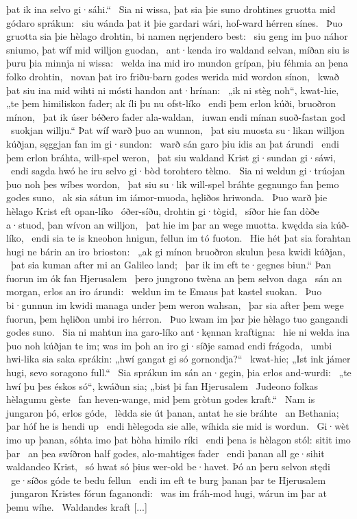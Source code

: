 þat ik ina selvo gi·sáhi.“ \hld\ Sia ni wissa, þat sia þie suno drohtines
gruotta mid gódaro sprákun: \hld\ siu wánda þat it þie gardari wári,
hof-ward hérren sínes. \hld\ Þuo gruotta sia þie hèlago drohtin,
bi namen nęrjendero best: \hld\ siu geng im þuo náhor sniumo,
þat wíf mid willjon guodan, \hld\ ant·kenda iro waldand selvan,
míðan siu is þuru þia minnja ni wissa: \hld\ welda ina mid iro mundon grípan,
þiu féhmia an þena folko drohtin, \hld\ novan þat iro friðu-barn godes
werida mid wordon sínon, \hld\ kwað þat siu ina mid wihti ni mósti
handon ant·hrínan: \hld\ „ik ni stèg noh“, kwat-hie, „te þem himiliskon fader;
ak íli þu nu ofst-líko \hld\ endi þem erlon kúði,
bruoðron mínon, \hld\ þat ik úser béðero fader
ala-waldan, \hld\ iuwan endi mínan
suoð-fastan god \hld\ suokjan willju.“
Þat wíf warð þuo an wunnon, \hld\ þat siu muosta su·likan willjon kúðjan,
sęggjan fan im gi·sundon: \hld\ warð sán garo
þiu idis an þat árundi \hld\ endi þem erlon bráhta,
will-spel weron, \hld\ þat siu waldand Krist
gi·sundan gi·sáwi, \hld\ endi sagda hwó he iru selvo gi·bòd
torohtero tèkno. \hld\ Sia ni weldun gi·trúojan þuo noh
þes wíbes wordon, \hld\ þat siu su·lik will-spel bráhte
gegnungo fan þemo godes suno, \hld\ ak sia sátun im iámor-muoda,
hęliðos hriwonda. \hld\ Þuo warð þie hèlago Krist
eft opan-líko \hld\ óðer-síðu,
drohtin gi·tògid, \hld\ síðor hie fan dòðe a·stuod,
þan wívon an willjon, \hld\ þat hie im þar an wege muotta.
kwędda sia kúð-líko, \hld\ endi sia te is kneohon hnigun,
fellun im tó fuoton. \hld\ Hie hét þat sia forahtan hugi
ne bárin an iro brioston: \hld\ „ak gi mínon bruoðron skulun
þesa kwidi kúðjan, \hld\ þat sia kuman after mi
an Galileo land; \hld\ þar ik im eft te·gegnes biun.“
Þan fuorun im ók fan Hjerusalem \hld\ þero jungrono twèna
an þem selvon daga \hld\ sán an morgan,
erlos an iro árundi: \hld\ weldun im te Emaus
þat kastel suokan. \hld\ Þuo bi·gunnun im kwidi managa
under þem weron wahsan, \hld\ þar sia after þem wege fuorun,
þem hęliðon umbi iro hérron. \hld\ Þuo kwam im þar þie hèlago tuo
gangandi godes suno. \hld\ Sia ni mahtun ina garo-líko
ant·kęnnan kraftigna: \hld\ hie ni welda ina þuo noh kúðjan te im;
was im þoh an iro gi·síðje samad endi frágoda, \hld\ umbi hwi-lika sia saka sprákin:
„hwí gangat gi só gornondja?“ \hld\ kwat-hie; „Ist ink jámer hugi,
sevo soragono full.“ \hld\ Sia sprákun im sán an·gegin,
þia erlos and-wurdi: \hld\ „te hwí þu þes éskos só“, kwáðun sia;
„bist þi fan Hjerusalem \hld\ Judeono folkas
hèlagumu gèste \hld\ fan heven-wange,
mid þem gròtun godes kraft.“ \hld\ Nam is jungaron þó,
erlos góde, \hld\ lèdda sie út þanan,
antat he sie bráhte \hld\ an Bethania;
þar hóf he is hendi up \hld\ endi hèlegoda sie alle,
wíhida sie mid is wordun. \hld\ Gi·wèt imo up þanan,
sóhta imo þat hòha himilo ríki \hld\ endi þena is hèlagon stól:
sitit imo þar \hld\ an þea swíðron half godes,
alo-mahtiges fader \hld\ endi þanan all ge·sihit
waldandeo Krist, \hld\ só hwat só þius wer-old be·havet.
Þó an þeru selvon stędi \hld\ ge·síðos góde
te bedu fellun \hld\ endi im eft te burg þanan
þar te Hjerusalem \hld\ jungaron Kristes
fórun faganondi: \hld\ was im fráh-mod hugi,
wárun im þar at þemu wíhe. \hld\ Waldandes kraft
[...]
